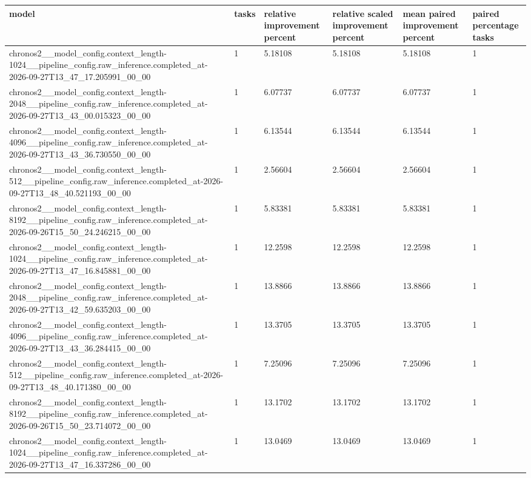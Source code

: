 \begin{tabular}{llllll}
\toprule
model & tasks & relative improvement percent & relative scaled improvement percent & mean paired improvement percent & paired percentage tasks \\
\midrule
chronos2\_\_model\_config.context\_length-1024\_\_pipeline\_config.raw\_inference.completed\_at-2026-09-27T13\_47\_17.205991\_00\_00 & 1 & 5.18108 & 5.18108 & 5.18108 & 1 \\
chronos2\_\_model\_config.context\_length-2048\_\_pipeline\_config.raw\_inference.completed\_at-2026-09-27T13\_43\_00.015323\_00\_00 & 1 & 6.07737 & 6.07737 & 6.07737 & 1 \\
chronos2\_\_model\_config.context\_length-4096\_\_pipeline\_config.raw\_inference.completed\_at-2026-09-27T13\_43\_36.730550\_00\_00 & 1 & 6.13544 & 6.13544 & 6.13544 & 1 \\
chronos2\_\_model\_config.context\_length-512\_\_pipeline\_config.raw\_inference.completed\_at-2026-09-27T13\_48\_40.521193\_00\_00 & 1 & 2.56604 & 2.56604 & 2.56604 & 1 \\
chronos2\_\_model\_config.context\_length-8192\_\_pipeline\_config.raw\_inference.completed\_at-2026-09-26T15\_50\_24.246215\_00\_00 & 1 & 5.83381 & 5.83381 & 5.83381 & 1 \\
chronos2\_\_model\_config.context\_length-1024\_\_pipeline\_config.raw\_inference.completed\_at-2026-09-27T13\_47\_16.845881\_00\_00 & 1 & 12.2598 & 12.2598 & 12.2598 & 1 \\
chronos2\_\_model\_config.context\_length-2048\_\_pipeline\_config.raw\_inference.completed\_at-2026-09-27T13\_42\_59.635203\_00\_00 & 1 & 13.8866 & 13.8866 & 13.8866 & 1 \\
chronos2\_\_model\_config.context\_length-4096\_\_pipeline\_config.raw\_inference.completed\_at-2026-09-27T13\_43\_36.284415\_00\_00 & 1 & 13.3705 & 13.3705 & 13.3705 & 1 \\
chronos2\_\_model\_config.context\_length-512\_\_pipeline\_config.raw\_inference.completed\_at-2026-09-27T13\_48\_40.171380\_00\_00 & 1 & 7.25096 & 7.25096 & 7.25096 & 1 \\
chronos2\_\_model\_config.context\_length-8192\_\_pipeline\_config.raw\_inference.completed\_at-2026-09-26T15\_50\_23.714072\_00\_00 & 1 & 13.1702 & 13.1702 & 13.1702 & 1 \\
chronos2\_\_model\_config.context\_length-1024\_\_pipeline\_config.raw\_inference.completed\_at-2026-09-27T13\_47\_16.337286\_00\_00 & 1 & 13.0469 & 13.0469 & 13.0469 & 1 \\

\end{tabular}
